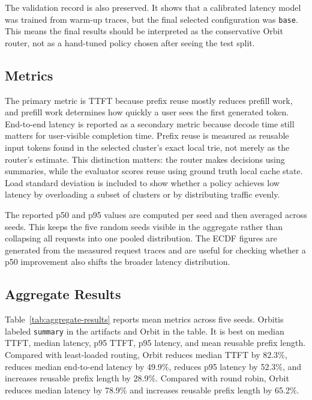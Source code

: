 \documentclass[10pt,twocolumn]{article}
\newcommand{\sys}{Orbit}
\begin{document}
The validation record is also preserved. It shows that a calibrated latency model was trained from warm-up traces, but the final selected configuration was \texttt{base}. This means the final results should be interpreted as the conservative Orbit router, not as a hand-tuned policy chosen after seeing the test split.

\subsection{Metrics}

The primary metric is TTFT because prefix reuse mostly reduces prefill work, and prefill work determines how quickly a user sees the first generated token. End-to-end latency is reported as a secondary metric because decode time still matters for user-visible completion time. Prefix reuse is measured as reusable input tokens found in the selected cluster's exact local trie, not merely as the router's estimate. This distinction matters: the router makes decisions using summaries, while the evaluator scores reuse using ground truth local cache state. Load standard deviation is included to show whether a policy achieves low latency by overloading a subset of clusters or by distributing traffic evenly.

The reported p50 and p95 values are computed per seed and then averaged across seeds. This keeps the five random seeds visible in the aggregate rather than collapsing all requests into one pooled distribution. The ECDF figures are generated from the measured request traces and are useful for checking whether a p50 improvement also shifts the broader latency distribution.

\subsection{Aggregate Results}

Table~\ref{tab:aggregate-results} reports mean metrics across five seeds. \sys is labeled \texttt{summary} in the artifacts and Orbit in the table. It is best on median TTFT, median latency, p95 TTFT, p95 latency, and mean reusable prefix length. Compared with least-loaded routing, Orbit reduces median TTFT by 82.3\%, reduces median end-to-end latency by 49.9\%, reduces p95 latency by 52.3\%, and increases reusable prefix length by 28.9\%. Compared with round robin, Orbit reduces median latency by 78.9\% and increases reusable prefix length by 65.2\%.
\end{document}
